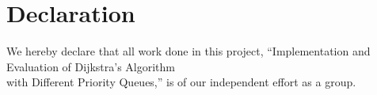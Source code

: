 
\section*{Declaration}
We hereby declare that all work done in this project,
``Implementation and Evaluation of Dijkstra's Algorithm\\
with Different Priority Queues,'' is of our independent effort as a group.



